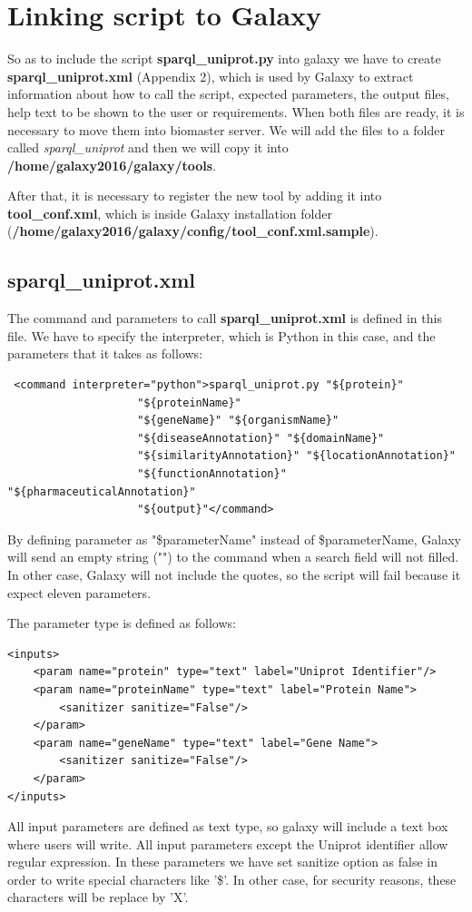 \documentclass[12pt]{article}
\begin{document}
\section{Linking script to Galaxy}
So as to include the script \textbf{sparql\_uniprot.py} into galaxy we have to create \textbf{sparql\_uniprot.xml} (Appendix 2), which is used by Galaxy to extract information about how to call the script, expected parameters, the output files, help text to be shown to the user or requirements. When both files are ready, it is necessary to move them into biomaster server. We will add the files to a folder called \textit{sparql\_uniprot} and then we will copy it into \textbf{/home/galaxy2016/galaxy/tools}.

After that, it is necessary to register the new tool by adding it into \textbf{tool\_conf.xml}, which is inside Galaxy installation folder (\textbf{/home/galaxy2016/galaxy/config/tool\_conf.xml.sample}).

\subsection{sparql\_uniprot.xml}
The command and parameters to call \textbf{sparql\_uniprot.xml} is defined in this file. We have to specify the interpreter, which is Python in this case, and the parameters that it takes as follows:
\begin{verbatim}
 <command interpreter="python">sparql_uniprot.py "${protein}"
 					"${proteinName}"
 					"${geneName}" "${organismName}"
 					"${diseaseAnnotation}" "${domainName}"
 					"${similarityAnnotation}" "${locationAnnotation}"
 					"${functionAnnotation}" "${pharmaceuticalAnnotation}"
 					"${output}"</command>
\end{verbatim}
By defining parameter as "\${parameterName}" instead of \$parameterName, Galaxy will send an empty string ("") to the command when a search field will not filled. In other case, Galaxy will not include the quotes, so the script will fail because it expect eleven parameters.

The parameter type is defined as follows:
\begin{verbatim}
<inputs>
    <param name="protein" type="text" label="Uniprot Identifier"/>
    <param name="proteinName" type="text" label="Protein Name">
        <sanitizer sanitize="False"/>
    </param>
    <param name="geneName" type="text" label="Gene Name">
        <sanitizer sanitize="False"/>
    </param>
</inputs>
\end{verbatim}
All input parameters are defined as text type, so galaxy will include a text box where users will write. All input parameters except the Uniprot identifier allow regular expression. In these parameters we have set sanitize option as false in order to write special characters like '\$'. In other case, for security reasons, these characters will be replace by 'X'.
\end{document}
